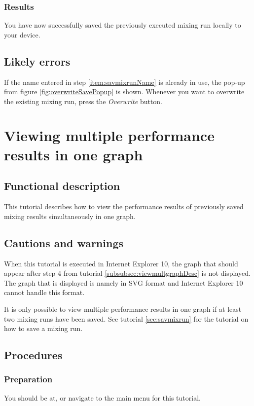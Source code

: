 \subsubsection{Results}
You have now successfully saved the previously executed mixing run locally to your device.

\subsection{Likely errors}
If the name entered in step \ref{item:savmixrunName} is already in use, the pop-up from figure \ref{fig:overwriteSavePopup} is shown. Whenever you want to overwrite the existing mixing run, press the \emph{Overwrite} button.


\section{Viewing multiple performance results in one graph}
\label{sec:viewmultgraph}

\subsection{Functional description}
This tutorial describes how to view the performance results of previously saved mixing results simultaneously in one graph.

\subsection{Cautions and warnings}
When this tutorial is executed in Internet Explorer 10, the graph that should appear after step 4 from tutorial \ref{subsubsec:viewmultgraphDesc} is not displayed. The graph that is displayed is namely in SVG format and Internet Explorer 10 cannot handle this format.

It is only possible to view multiple performance results in one graph if at least two mixing runs have been saved. See tutorial \ref{sec:savmixrun} for the tutorial on how to save a mixing run.

\subsection{Procedures}

\subsubsection{Preparation}
You should be at, or navigate to the main menu for this tutorial.

